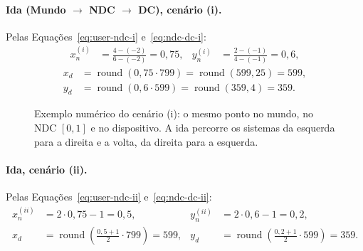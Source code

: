\paragraph{Ida (Mundo $\rightarrow$ NDC $\rightarrow$ DC), cenário (i).} Pelas Equações~\eqref{eq:user-ndc-i} e~\eqref{eq:ndc-dc-i}:
\begin{align*}
    x_n^{(i)} &= \frac{4 - (-2)}{6 - (-2)} = 0{,}75, &
    y_n^{(i)} &= \frac{2 - (-1)}{4 - (-1)} = 0{,}6,
\end{align*}
\begin{align*}
    x_d &= \operatorname{round}(0{,}75 \cdot 799) = \operatorname{round}(599{,}25) = 599, \\
    y_d &= \operatorname{round}(0{,}6 \cdot 599) = \operatorname{round}(359{,}4) = 359.
\end{align*}

\begin{figure}[H]
    \centering
    \caption{Exemplo numérico do cenário (i): o mesmo ponto no mundo, no NDC $[0,1]$ e no dispositivo. A ida percorre os sistemas da esquerda para a direita e a volta, da direita para a esquerda.}
    \label{fig:exemplo-i}
\end{figure}

\paragraph{Ida, cenário (ii).} Pelas Equações~\eqref{eq:user-ndc-ii} e~\eqref{eq:ndc-dc-ii}:
\begin{align*}
    x_n^{(ii)} &= 2 \cdot 0{,}75 - 1 = 0{,}5, &
    y_n^{(ii)} &= 2 \cdot 0{,}6 - 1 = 0{,}2, \\
    x_d &= \operatorname{round}\!\left( \tfrac{0{,}5 + 1}{2} \cdot 799 \right) = 599, &
    y_d &= \operatorname{round}\!\left( \tfrac{0{,}2 + 1}{2} \cdot 599 \right) = 359.
\end{align*}

